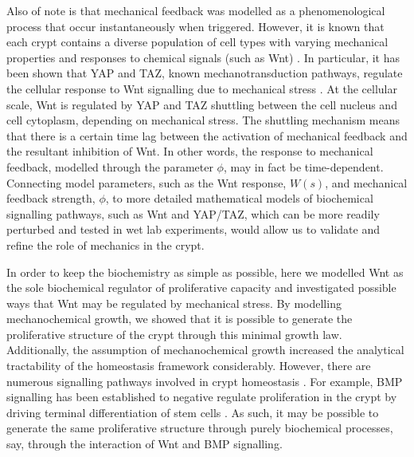 Also of note is that mechanical feedback was modelled as a phenomenological process that occur instantaneously when triggered. However, it is known that each crypt contains a diverse population of cell types with varying mechanical properties and responses to chemical signals (such as Wnt) \cite{spit2018tales}. In particular, it has been shown that YAP and TAZ, known mechanotransduction pathways, regulate the cellular response to Wnt signalling due to mechanical stress \cite{azzolin2014yap}. At the cellular scale, Wnt is regulated by YAP and TAZ shuttling between the cell nucleus and cell cytoplasm, depending on mechanical stress. The shuttling mechanism means that there is a certain time lag between the activation of mechanical feedback and the resultant inhibition of Wnt. In other words, the response to mechanical feedback, modelled through the parameter $\phi$, may in fact be time-dependent. Connecting model parameters, such as the Wnt response, $W(s)$, and mechanical feedback strength, $\phi$, to more detailed mathematical models of biochemical signalling pathways, such as Wnt and YAP/TAZ, which can be more readily perturbed and tested in wet lab experiments, would allow us to validate and refine the role of mechanics in the crypt. 

In order to keep the biochemistry as simple as possible, here we modelled Wnt as the sole biochemical regulator of proliferative capacity and investigated possible ways that Wnt may be regulated by mechanical stress. By modelling mechanochemical growth, we showed that it is possible to generate the proliferative structure of the crypt through this minimal growth law. Additionally, the assumption of mechanochemical growth increased the analytical tractability of the homeostasis framework considerably. However, there are numerous signalling pathways involved in crypt homeostasis \cite{spit2018tales}. For example, BMP signalling has been established to negative regulate proliferation in the crypt by driving terminal differentiation of stem cells \cite{haramis2004novo}. As such, it may be possible to generate the same proliferative structure through purely biochemical processes, say, through the interaction of Wnt and BMP signalling. 

